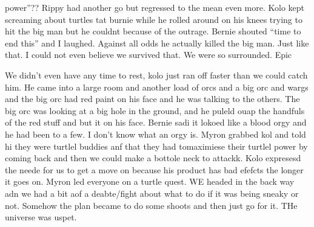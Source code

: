 power”?? Rippy had another go but regressed to the mean even more. Kolo kept screaming about turtles tat burnie while he rolled around on his knees trying to hit the big man but he couldnt because of the outrage. Bernie shouted “time to end this” and I laughed. Against all odds he actually killed the big man. Just like that. I could not even believe we survived that. We were so surrounded. Epic\medskip

We didn’t even have any time to rest, kolo just ran off faster than we could catch him. He came into a large room and another load of orcs and a big orc and wargs and the big orc had red paint on his face and he was talking to the others. The big orc was looking at a big hole in the ground, and he puleld ouap the handfuls of the red stuff and but it on his face. Bernie sadi it lokoed like a blood orgy and he had been to a few. I don’t know what an orgy is. Myron grabbed kol and told hi they were turtlel buddies anf that they had tomaximiese their turtlel power by coming back and then we could make a bottole neck to attackk. Kolo expresesd the neede for us to get a move on because his product has bad efefcts the longer it goes on. Myron led everyone on a turtle quest. WE headed in the back way adn we had a bit aof a deabte/fight about what to do if it was being sneaky or not. Somehow the plan became to do some shoots and then just go for it. THe universe was uspet.\medskip


